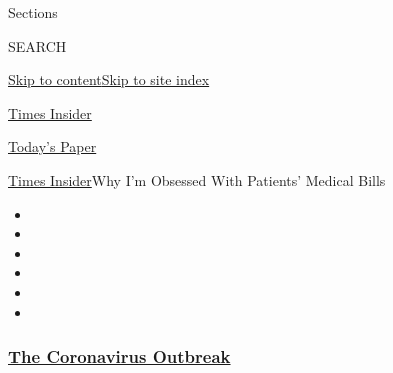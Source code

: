 Sections

SEARCH

\protect\hyperlink{site-content}{Skip to
content}\protect\hyperlink{site-index}{Skip to site index}

\href{https://www.nytimes3xbfgragh.onion/section/reader-center}{Times
Insider}

\href{https://myaccount.nytimes3xbfgragh.onion/auth/login?response_type=cookie\&client_id=vi}{}

\href{https://www.nytimes3xbfgragh.onion/section/todayspaper}{Today's
Paper}

\href{/section/reader-center}{Times Insider}\textbar{}Why I'm Obsessed
With Patients' Medical Bills

\begin{itemize}
\item
\item
\item
\item
\item
\item
\end{itemize}

\hypertarget{the-coronavirus-outbreak}{%
\subsubsection{\texorpdfstring{\href{https://www.nytimes3xbfgragh.onion/news-event/coronavirus?name=styln-coronavirus-national\&region=TOP_BANNER\&block=storyline_menu_recirc\&action=click\&pgtype=Article\&impression_id=590f0310-f4b7-11ea-8fc3-e39d92f58733\&variant=undefined}{The
Coronavirus
Outbreak}}{The Coronavirus Outbreak}}\label{the-coronavirus-outbreak}}

